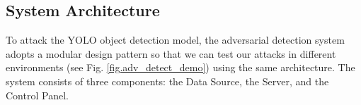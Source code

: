 

\subsection{System Architecture}

To attack the YOLO object detection model, the adversarial detection system adopts a modular design pattern so that we can test our attacks in different environments (see Fig. \ref{fig.adv_detect_demo}) using the same architecture. The system consists of three components: the Data Source, the Server, and the Control Panel.


